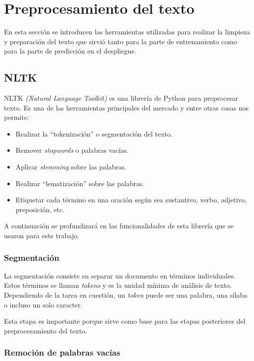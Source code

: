 \section{Preprocesamiento del texto}

En esta sección se introducen las herramientas utilizadas para realizar la limpieza y preparación del texto que sirvió tanto para la parte de entrenamiento como para la parte de predicción en el despliegue.

\subsection{NLTK}

NLTK \textit{(Natural Language Toolkit)} es una librería de Python para preprocesar texto. Es una de las herramientas principales del mercado y entre otras cosas nos permite:
\begin{itemize}
\item Realizar la ``tokenización'' o segmentación del texto.
\item Remover \textit{stopwords} o palabras vacías.
\item Aplicar \textit{stemming} sobre las palabras.
\item Realizar ``lematización'' sobre las palabras.
\item Etiquetar cada término en una oración según sea sustantivo, verbo, adjetivo, preposición, etc.
\end{itemize}

A continuación se profundizará en las funcionalidades de esta librería que se usaron para este trabajo.

\subsubsection{Segmentación}

La segmentación consiste en separar un documento en términos individuales. Estos términos se llaman \textit{tokens} y es la unidad mínima de análisis de texto. Dependiendo de la tarea en cuestión, un \textit{token} puede ser una palabra, una sílaba o incluso un solo caracter.

Esta etapa es importante porque sirve como base para las etapas posteriores del preprocesamiento del texto.

\subsubsection{Remoción de palabras vacías}

